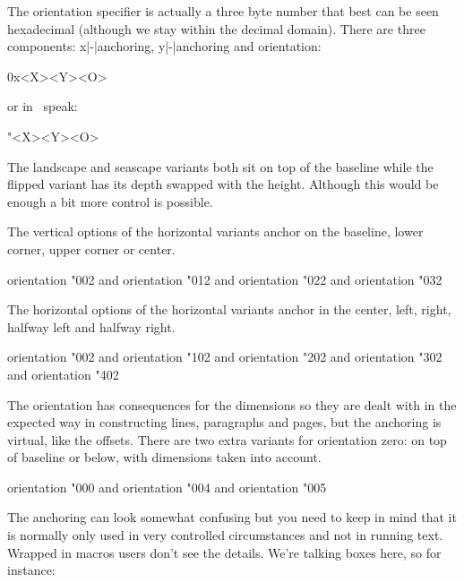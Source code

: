 The orientation specifier is actually a three byte number that best can be seen
hexadecimal (although we stay within the decimal domain). There are three
components: x|-|anchoring, y|-|anchoring and orientation:

\starttyping
0x<X><Y><O>
\stoptyping

or in \TEX\ speak:

\starttyping
"<X><Y><O>
\stoptyping

The landscape and seascape variants both sit on top of the baseline while the
flipped variant has its depth swapped with the height. Although this would be
enough a bit more control is possible.

The vertical options of the horizontal variants anchor on the baseline, lower
corner, upper corner or center.

\startbuffer
{} orientation "002 {\TEX} and
 orientation "012 {\TEX} and
 orientation "022 {\TEX} and
 orientation "032 {\TEX}
\stopbuffer

\typebuffer[option=TEX]

\startlinecorrection
{}
\stoplinecorrection

The horizontal options of the horizontal variants anchor in the center, left,
right, halfway left and halfway right.

\startbuffer
{} orientation "002 {\TEX} and
 orientation "102 {\TEX} and
 orientation "202 {\TEX} and
 orientation "302 {\TEX} and
 orientation "402 {\TEX}
\stopbuffer

\typebuffer[option=TEX]

\startlinecorrection
{}
\stoplinecorrection

The orientation has consequences for the dimensions so they are dealt with in the
expected way in constructing lines, paragraphs and pages, but the anchoring is
virtual, like the offsets. There are two extra variants for orientation zero: on
top of baseline or below, with dimensions taken into account.

\startbuffer
{} orientation "000 {\TEX} and
 orientation "004 {\TEX} and
 orientation "005 {\TEX}
\stopbuffer

\typebuffer[option=TEX]

\startlinecorrection
{}
\stoplinecorrection

The anchoring can look somewhat confusing but you need to keep in mind that it is
normally only used in very controlled circumstances and not in running text.
Wrapped in macros users don't see the details. We're talking boxes here, so for
instance:

